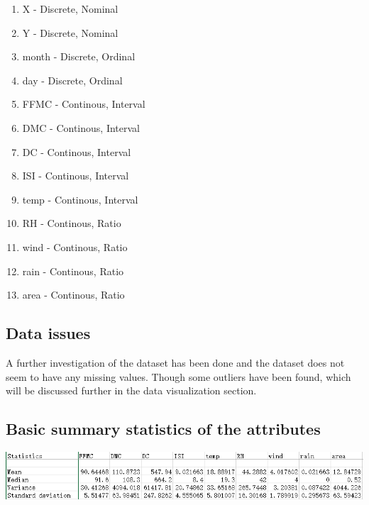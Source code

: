 \begin{enumerate}
	\item X - Discrete, Nominal
	\item Y - Discrete, Nominal
	\item month - Discrete, Ordinal
	\item day - Discrete, Ordinal
	\item FFMC - Continous, Interval
	\item DMC - Continous, Interval
	\item DC - Continous, Interval
	\item ISI - Continous, Interval
	\item temp - Continous, Interval
	\item RH - Continous, Ratio
	\item wind - Continous, Ratio
	\item rain - Continous, Ratio
	\item area - Continous, Ratio
\end{enumerate}

\subsection{Data issues}
A further investigation of the dataset has been done and the dataset does not seem to have any missing values. Though some outliers have been found, which will be discussed further in the data visualization section.

\subsection{Basic summary statistics of the attributes}
\includegraphics[width=\textwidth]{fig/summary_statistics.png}